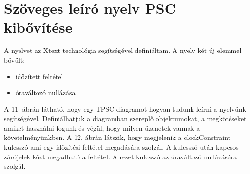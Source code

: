 \chapter{Szöveges leíró nyelv PSC kibővítése}

A nyelvet az Xtext technológia segítségével definiáltam. A nyelv két új elemmel bővült:
\begin{itemize}
    \item időzített feltétel
    \item óraváltozó nullázása
\end{itemize}

A 11. ábrán látható, hogy egy TPSC diagramot hogyan tudunk leírni a nyelvünk segítségével. Definiálhatjuk a diagramban szereplő objektumokat, a megkötéseket amiket használni fogunk és végül, hogy milyen üzenetek vannak a követelményünkben.
A 12. ábrán látszik, hogy megjelenik a clockConstraint kulcsszó ami egy időzítési feltétel megadására szolgál. A kulcsszó után kapcsos zárójelek közt megadható a feltétel. A reset kulcsszó az óraváltozó nullázására szolgál.